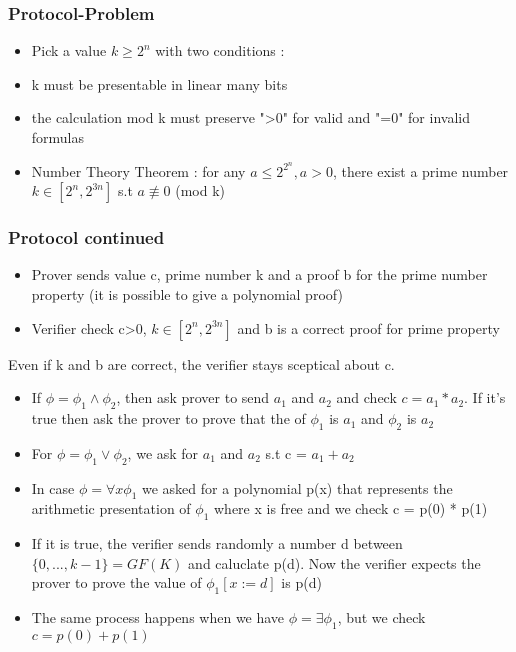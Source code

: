 \documentclass[hyperref={pdfpagelabels=false},t,10pt]{beamer}
\begin{document}
\begin{frame}
  \frametitle{Protocol-Problem}
  \begin{itemize}
    \item Pick a value $k \geq 2^n$ with two conditions : 
    \item k must be presentable in linear many bits \pause
    \item the calculation mod k must preserve ">0" for valid and "=0" for invalid formulas
    \item Number Theory Theorem : for any $a \leq 2^{2^{n}}, a>0$, there exist a prime number $k \in [2^n, 2^{3n}]$ s.t $a \not\equiv 0 $ (mod k)
  \end{itemize}
\end{frame}

\begin{frame}
  \frametitle{Protocol continued}
  \begin{itemize}
    \item Prover sends value c, prime number k and a proof b for the prime number property (it is possible to give a polynomial proof) \pause
    \item Verifier check c>0, $k \in [2^n, 2^{3n}]$ and b is a correct proof for prime property 
  \end{itemize}
  Even if k and b are correct, the verifier stays sceptical about c. \pause

  \begin{itemize}
    \item If $\phi = \phi_1 \land \phi_2 $, then ask prover to send $a_1$ and $a_2$ and check $c = a_1 * a_2$. If it's true then ask the prover to prove that the of $\phi_1$ is $a_1$ and $\phi_2$ is $a_2$
    \item For $\phi = \phi_1 \lor \phi_2$, we ask for $a_1$ and $a_2$ s.t c = $a_1 + a_2$ \pause
    \item In case $\phi = \forall x \phi_1$ we asked for a polynomial p(x) that represents the arithmetic presentation of $\phi_1$ where x is free and we check c = p(0) * p(1)
    \item If it is true, the verifier sends randomly a number d between $\{0,..., k-1\} = GF(K)$ and caluclate p(d). Now the verifier expects the prover to prove the value of $\phi_1[x := d]$ is p(d)
    \item The same process happens when we have $\phi = \exists \phi_1$, but we check $c = p(0) + p(1)$
  \end{itemize}
  
\end{frame}
\end{document}
